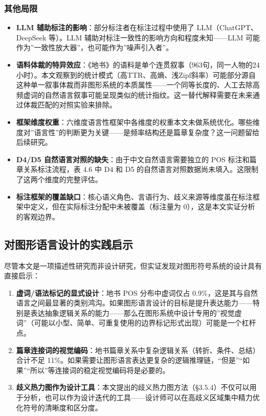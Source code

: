 \documentclass[12pt,a4paper,UTF8,fontset=founder]{ctexart}
\begin{document}
\subsubsection{其他局限}\label{ux5176ux4ed6ux5c40ux9650}

\begin{itemize}

\item
  \textbf{LLM 辅助标注的影响}：部分标注者在标注过程中使用了 LLM（ChatGPT、DeepSeek 等）。LLM 辅助对标注一致性的影响方向和程度未知------LLM 可能作为''一致性放大器''，也可能作为''噪声引入者''。
\item
  \textbf{语料体裁的特异效应}：《地书》的语料是单个连贯叙事（963句，同一人物的24小时）。本文观察到的统计模式（高TTR、高熵、浅Zipf斜率）可能部分源自这种单一叙事体裁而非图形系统的本质属性------一个同等长度的、人工去除高频虚词的自然语言叙事可能呈现类似的统计指纹。这一替代解释需要在未来通过体裁匹配的对照实验来排除。
\item
  \textbf{框架维度权重}：六维度语言性框架中各维度的权重本文未做系统优化。哪些维度对''语言性''的判断更为关键------是频率结构还是篇章复杂度？这一问题留给后续研究。
\item
  \textbf{D4/D5 自然语言对照的缺失}：由于中文自然语言需要独立的 POS 标注和篇章关系标注流程，表 $4.6$ 中 D4 和 D5 的自然语言对照数据尚未填入。这限制了这两个维度的完整评估。
\item
  \textbf{标注框架的覆盖缺口}：核心语义角色、言语行为、歧义来源等维度虽在标注框架中定义，但在实际标注分配中未被覆盖（标注量为 0），这是本文实证分析的客观边界。
\end{itemize}

\subsection{对图形语言设计的实践启示}\label{ux5bf9ux56feux5f62ux8bedux8a00ux8bbeux8ba1ux7684ux5b9eux8df5ux542fux793a}

尽管本文是一项描述性研究而非设计研究，但实证发现对图形符号系统的设计具有直接启示：

\begin{enumerate}
\def\labelenumi{\arabic{enumi}.}
\item
  \textbf{虚词/语法标记的显式设计}：地书 POS 分布中虚词仅占 $0.9$\%，这是其与自然语言之间最显著的类别鸿沟。如果图形语言设计的目标是提升表达能力------特别是表达抽象逻辑关系的能力------那么在图形系统中设计专用的''视觉虚词''（可能以小型、简单、可重复使用的边界标记形式出现）可能是一个杠杆点。
\item
  \textbf{篇章连接词的视觉编码}：地书篇章关系中复杂逻辑关系（转折、条件、总结）合计不足 11\%。如果需要让图形语言表达更复杂的逻辑推理链，``但是''``如果''``所以''等连接词的稳定视觉编码将是必要的。
\item
  \textbf{歧义热力图作为设计工具}：本文提出的歧义热力图方法（§$3.5$.4）不仅可以用于分析，也可以作为设计迭代的工具------设计师可以在高歧义区域集中精力优化符号的清晰度和区分度。
\end{enumerate}
\end{document}
